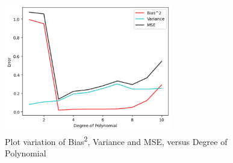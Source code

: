 \documentclass[a4paper]{myarticle}
\begin{document}
\begin{figure}[H]
  \centering
  \includegraphics[width=0.65\textwidth]{plot.png}
  \caption{Plot variation of Bias\textsuperscript{2}, Variance and MSE, versus Degree of Polynomial}
  \label{fig:q5}
\end{figure}
\end{document}
